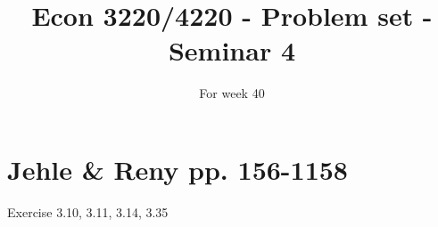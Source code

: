 \documentclass{article}
\title{Econ 3220/4220 - Problem set - Seminar 4 }
\date{For week 40}
\begin{document}
\maketitle


\section*{Jehle \& Reny pp. 156-1158}

Exercise 3.10, 3.11, 3.14, 3.35
\end{document}
